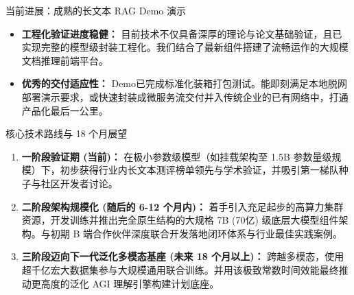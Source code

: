 ﻿\documentclass[aspectratio=169, 10pt]{beamer}
\begin{document}
\begin{frame}{当前进展：成熟的长文本 RAG Demo 演示}
\begin{itemize}
    \item \textbf{工程化验证进度稳健：} 目前技术不仅具备深厚的理论与论文基础验证，且已实现完整的模型级封装工程化。我们结合了最新组件搭建了流畅运作的大规模文档推理前端平台。
    \item \textbf{优秀的交付适应性：} Demo已完成标准化装箱打包测试。能即刻满足本地脱网部署演示要求，或快速封装成微服务流交付并入传统企业的已有网络中，打通产品化最后一公里。
\end{itemize}
\end{frame}

\begin{frame}{核心技术路线与 18 个月展望}
\begin{enumerate}
    \item \textbf{一阶段验证期 (当前)：} 在极小参数级模型（如挂载架构至 1.5B 参数量级规模）下，初步获得行业内长文本测评榜单领先与学术验证，并吸引第一梯队种子与社区开发者讨论。
    \vspace{0.5em}
    \item \textbf{二阶段架构规模化 (随后的 6-12 个月内)：} 着手引入充足起步的高算力集群资源，开发训练并推出完全原生结构的大规格 7B (70亿) 级底层大模型组件架构。与初期 B 端合作伙伴深度联合开发落地闭环体系与行业最佳实践案例。
    \vspace{0.5em}
    \item \textbf{三阶段迈向下一代泛化多模态基座 (未来 18 个月以上)：} 跨越多模态，使用超千亿宏大数据集参与大规模通用联合训练。并用该极致常数时间效能最终推动更高度的泛化 AGI 理解引擎构建计划底座。
\end{enumerate}
\end{frame}
\end{document}
